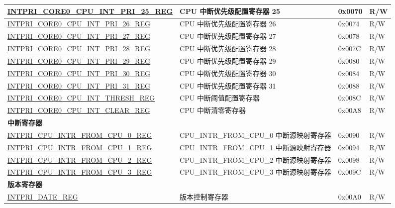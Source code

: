 \begin{longtable}{ | p{10cm} | p{10cm} | p{1.3cm} | p{1cm} | }
\hyperref[regdesc:INTPRICORE0CPUINTPRINREG]{INTPRI\_CORE0\_CPU\_INT\_PRI\_25\_REG} & CPU 中断优先级配置寄存器 25 & 0x0070 & R/W \\ \hline
\hyperref[regdesc:INTPRICORE0CPUINTPRINREG]{INTPRI\_CORE0\_CPU\_INT\_PRI\_26\_REG} & CPU 中断优先级配置寄存器 26 & 0x0074 & R/W \\ \hline
\hyperref[regdesc:INTPRICORE0CPUINTPRINREG]{INTPRI\_CORE0\_CPU\_INT\_PRI\_27\_REG} & CPU 中断优先级配置寄存器 27 & 0x0078 & R/W \\ \hline
\hyperref[regdesc:INTPRICORE0CPUINTPRINREG]{INTPRI\_CORE0\_CPU\_INT\_PRI\_28\_REG} & CPU 中断优先级配置寄存器 28 & 0x007C & R/W \\ \hline
\hyperref[regdesc:INTPRICORE0CPUINTPRINREG]{INTPRI\_CORE0\_CPU\_INT\_PRI\_29\_REG} & CPU 中断优先级配置寄存器 29 & 0x0080 & R/W \\ \hline
\hyperref[regdesc:INTPRICORE0CPUINTPRINREG]{INTPRI\_CORE0\_CPU\_INT\_PRI\_30\_REG} & CPU 中断优先级配置寄存器 30 & 0x0084 & R/W \\ \hline
\hyperref[regdesc:INTPRICORE0CPUINTPRINREG]{INTPRI\_CORE0\_CPU\_INT\_PRI\_31\_REG} & CPU 中断优先级配置寄存器 31 & 0x0088 & R/W \\ \hline
\hyperref[regdesc:INTPRICORE0CPUINTTHRESHREG]{INTPRI\_CORE0\_CPU\_INT\_THRESH\_REG} & CPU 中断阈值配置寄存器  & 0x008C & R/W \\ \hline
\hyperref[regdesc:INTPRICORE0CPUINTCLEARREG]{INTPRI\_CORE0\_CPU\_INT\_CLEAR\_REG} & CPU 中断清零寄存器 & 0x00A8 & R/W \\ \hline
\multicolumn{4}{|l|}{\textbf{中断寄存器}} \\ \hline
\hyperref[regdesc:INTPRICPUINTRFROMCPUNREG]{INTPRI\_CPU\_INTR\_FROM\_CPU\_0\_REG} & CPU\_INTR\_FROM\_CPU\_0 中断源映射寄存器 & 0x0090 & R/W \\ \hline
\hyperref[regdesc:INTPRICPUINTRFROMCPUNREG]{INTPRI\_CPU\_INTR\_FROM\_CPU\_1\_REG} & CPU\_INTR\_FROM\_CPU\_1 中断源映射寄存器 & 0x0094 & R/W \\ \hline
\hyperref[regdesc:INTPRICPUINTRFROMCPUNREG]{INTPRI\_CPU\_INTR\_FROM\_CPU\_2\_REG} & CPU\_INTR\_FROM\_CPU\_2 中断源映射寄存器 & 0x0098 & R/W \\ \hline
\hyperref[regdesc:INTPRICPUINTRFROMCPUNREG]{INTPRI\_CPU\_INTR\_FROM\_CPU\_3\_REG} & CPU\_INTR\_FROM\_CPU\_3 中断源映射寄存器 & 0x009C & R/W \\ \hline
\multicolumn{4}{|l|}{\textbf{版本寄存器}} \\ \hline
\hyperref[regdesc:INTPRIDATEREG]{INTPRI\_DATE\_REG} & 版本控制寄存器 & 0x00A0 & R/W \\ \hline
\end{longtable}
